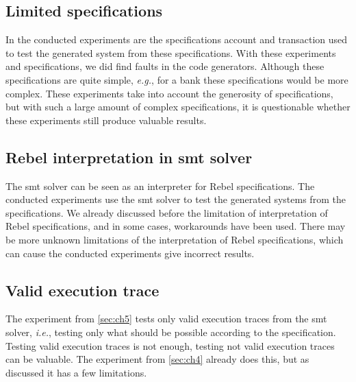 \subsection*{Limited specifications}
In the conducted experiments are the specifications account and transaction used
to test the generated system from these specifications. With these experiments
and specifications, we did find faults in the code generators. Although
these specifications are quite simple, \textit{e.g.}, for a bank these
specifications would be more complex. These experiments take into account the
generosity of specifications, but with such a large amount of complex
specifications, it is questionable whether these experiments still produce
valuable results.

\subsection*{Rebel interpretation in \gls{smt} solver}
The \gls{smt} solver can be seen as an interpreter for Rebel specifications. The
conducted experiments use the \gls{smt} solver to test the generated systems from the
specifications. We already discussed before the limitation of interpretation of
Rebel specifications, and in some cases, workarounds have been used. There may
be more unknown limitations of the interpretation of Rebel specifications, which
can cause the conducted experiments give incorrect results.

\subsection*{Valid execution trace}
The experiment from \autoref{sec:ch5} tests only valid execution traces from
the \gls{smt} solver, \textit{i.e.}, testing only what should be possible according to
the specification. Testing valid execution traces is not enough, testing not
valid execution traces can be valuable. The experiment from
\autoref{sec:ch4} already does this, but as discussed it has a few limitations.
